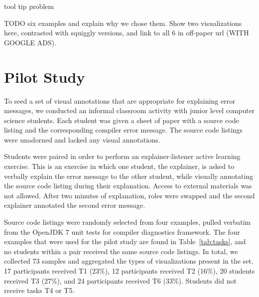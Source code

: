 \documentclass[conference]{IEEEtran}
\begin{document}
tool tip problem

TODO six examples and explain why we chose them.  Show two visualizations here, contrasted with squiggly versions, and link to all 6 in off-paper url (WITH GOOGLE ADS).


\section{Pilot Study}
\label{sec:pilotstudy}

To seed a set of visual annotations that are appropriate for explaining error messages, we conducted an informal classroom activity with junior level computer science students. Each student was given a sheet of paper with a source code listing and the corresponding compiler error message. The source code listings were unadorned and lacked any visual annotations.

Students were paired in order to perform an explainer-listener active learning exercise. This is an exercise in which one student, the explainer, is asked to verbally explain the error message to the other student, while visually annotating the source code listing during their explanation. Access to external materials was not allowed. After two minutes of explanation, roles were swapped and the second explainer annotated the second error message.

Source code listings were randomly selected from four examples, pulled verbatim from the OpenJDK 7 unit tests for compiler diagnostics framework. The four examples that were used for the pilot study are found in Table~\ref{tab:tasks}, and no students within a pair received the same source code listings. In total, we collected 73 samples and aggregated the types of visualizations present in the set.  17 participants received T1 (23\%), 12 participants received T2 (16\%), 20 students received T3 (27\%), and 24 participants received T6 (33\%). Students did not receive tasks T4 or T5.
\end{document}
